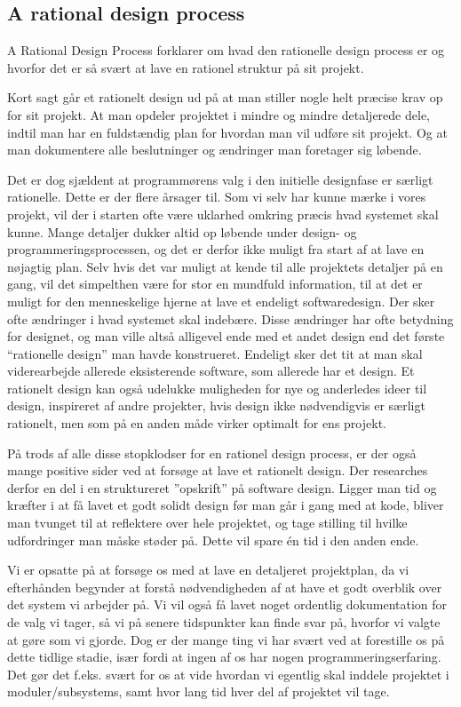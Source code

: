 \documentclass[12pt,a4paper]{article}
\begin{document}
\subsection{A rational design process}
A Rational Design Process forklarer om hvad den rationelle design process er og hvorfor det er så svært at lave en rationel struktur på sit projekt.

Kort sagt går et rationelt design ud på at man stiller nogle helt præcise krav op for sit projekt. At man opdeler projektet i mindre og mindre detaljerede dele, indtil man har en fuldstændig plan for hvordan man vil udføre sit projekt. Og at man dokumentere alle beslutninger og ændringer man foretager sig løbende.

Det er dog sjældent at programmørens valg i den initielle designfase er særligt rationelle. Dette er der flere årsager til. Som vi selv har kunne mærke i vores projekt, vil der i starten ofte være uklarhed omkring præcis hvad systemet skal kunne. Mange detaljer dukker altid op løbende under design- og programmeringsprocessen, og det er derfor ikke muligt fra start af at lave en nøjagtig plan. Selv hvis det var muligt at kende til alle projektets detaljer på en gang, vil det simpelthen være for stor en mundfuld information, til at det er muligt for den menneskelige hjerne at lave et endeligt softwaredesign. Der sker ofte ændringer i hvad systemet skal indebære. Disse ændringer har ofte betydning for designet, og man ville altså alligevel ende med et andet design end det første “rationelle design” man havde konstrueret. Endeligt sker det tit at man skal viderearbejde allerede eksisterende software, som allerede har et design. Et rationelt design kan også udelukke muligheden for nye og anderledes ideer til design, inspireret af andre projekter, hvis design ikke nødvendigvis er særligt rationelt, men som på en anden måde virker optimalt for ens projekt.

På trods af alle disse stopklodser for en rationel design process, er der også mange positive sider ved at forsøge at lave et rationelt design. Der researches derfor en del i en struktureret ”opskrift” på software design.
Ligger man tid og kræfter i at få lavet et godt solidt design før man går i gang med at kode, bliver man tvunget til at reflektere over hele projektet, og tage stilling til hvilke udfordringer man måske støder på. Dette vil spare én tid i den anden ende.

Vi er opsatte på at forsøge os med at lave en detaljeret projektplan, da vi efterhånden begynder at forstå nødvendigheden af at have et godt overblik over det system vi arbejder på. Vi vil også få lavet noget ordentlig dokumentation for de valg vi tager, så vi på senere tidspunkter kan finde svar på, hvorfor vi valgte at gøre som vi gjorde. 
Dog er der mange ting vi har svært ved at forestille os på dette tidlige stadie, især fordi at ingen af os har nogen programmeringserfaring. Det gør det f.eks. svært for os at vide hvordan vi egentlig skal inddele projektet i moduler/subsystems, samt hvor lang tid hver del af projektet vil tage.
\end{document}

